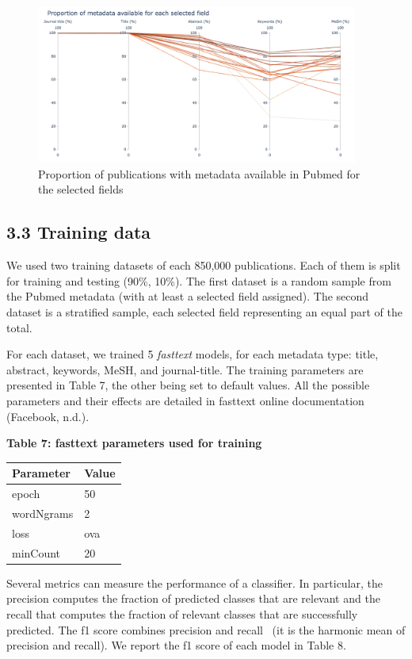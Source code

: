 \documentclass[
]{article}
\begin{document}
\begin{figure}
\centering
\includegraphics[width=4.16667in,height=\textheight]{missing_meta.png}
\caption{Proportion of publications with metadata available in Pubmed
for the selected fields}
\end{figure}

\hypertarget{training-data}{%
\subsection{3.3 Training data}\label{training-data}}

We used two training datasets of each 850,000 publications. Each of them
is split for training and testing (90\%, 10\%). The first dataset is a
random sample from the Pubmed metadata (with at least a selected field
assigned). The second dataset is a stratified sample, each selected
field representing an equal part of the total.

For each dataset, we trained 5 \emph{fasttext} models, for each metadata
type: title, abstract, keywords, MeSH, and journal-title. The training
parameters are presented in Table 7, the other being set to default
values. All the possible parameters and their effects are detailed in
fasttext online documentation (Facebook, n.d.).

\textbf{Table 7: fasttext parameters used for training}

\begin{longtable}[]{@{}ll@{}}
\toprule
Parameter & Value\tabularnewline
\midrule
\endhead
epoch & 50\tabularnewline
wordNgrams & 2\tabularnewline
loss & ova\tabularnewline
minCount & 20\tabularnewline
\bottomrule
\end{longtable}

Several metrics can measure the performance of a classifier. In
particular, the precision computes the fraction of predicted classes
that are relevant and the recall that computes the fraction of relevant
classes that are successfully predicted. The f1 score combines precision
and recall ~(it is the harmonic mean of precision and recall). We report
the f1 score of each model in Table 8.
\end{document}
